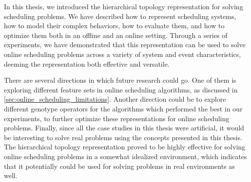 In this thesis, we introduced the hierarchical topology representation for solving scheduling problems. We have described how to represent scheduling systems, how to model their complex behaviors, how to evaluate them, and how to optimize them both in an offline and an online setting. Through a series of experiments, we have demonstrated that this representation can be used to solve online scheduling problems across a variety of system and event characteristics, deeming the representation both effective and versatile.

There are several directions in which future research could go. One of them is exploring different feature sets in online scheduling algorithms, as discussed in \ref{sec:online_scheduling_limitations}. Another direction could be to explore different genotype operators for the algorithms which performed the best in our experiments, to further optimize these representations for online scheduling problems. Finally, since all the case studies in this thesis were artificial, it would be interesting to solve real problems using the concepts presented in this thesis. The hierarchical topology representation proved to be highly effective for solving online scheduling problems in a somewhat idealized environment, which indicates that it potentially could be used for solving problems in real environments as well.